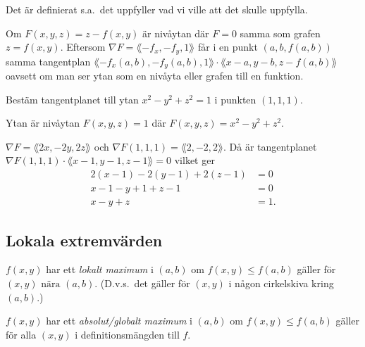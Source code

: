 \documentclass[a4paper]{article}
\begin{document}
Det är definierat s.a.\ det uppfyller vad vi ville att det skulle uppfylla.

\begin{obs}
    Om \(
        F(x,y,z) = z-f(x,y)
    \) är nivåytan där \(
        F = 0
    \) samma som grafen \(
        z = f(x,y)
    \). Eftersom \(
        \nabla F = \lang -f_x, -f_y, 1\rang
    \) får i en punkt \(
        (a, b, f(a,b)) 
    \) samma tangentplan \(
        \lang -f_x(a,b), -f_y(a,b), 1\rang \cdot \lang x-a, y-b, z-f(a,b)\rang
    \) oavsett om man ser ytan som en nivåyta eller grafen till en funktion.
\end{obs}

\begin{ex}
    Bestäm tangentplanet till ytan \(
        x^2-y^2+z^2 = 1
    \) i punkten \(
        (1, 1, 1)
    \). 

    Ytan är nivåytan \(
        F(x,y,z) = 1
    \) där \(
        F(x,y,z) = x^2-y^2+z^2
    \).

    \(
        \nabla F = \lang 2x, -2y, 2z\rang 
    \) och \(
        \nabla F(1,1,1) = \lang 2, -2, 2\rang
    \). Då är tangentplanet \(
        \nabla F(1,1,1) \cdot \lang x-1, y-1, z-1 \rang = 0
    \) vilket ger 
    \begin{align*}
        2(x-1)-2(y-1)+2(z-1)&=0\\
        x-1-y+1+z-1 &= 0 \\
        x-y+z &= 1.
    \end{align*}
\end{ex}

\subsection{Lokala extremvärden}
\begin{defn}
    \(
        f(x,y) 
    \) har ett \emph{lokalt maximum} i \(
        (a,b)
    \) om \(
        f(x,y) \leq f(a,b)
    \) gäller för \(
        (x,y) \text{ nära } (a,b)
    \). (D.v.s.\ det gäller för \(
        (x,y) 
    \) i någon cirkelskiva kring \(
        (a,b)
    \).)
\end{defn}

\begin{defn}
    \(
        f(x,y) 
    \) har ett \emph{absolut/globalt maximum} i \(
        (a,b)
    \) om \(
        f(x,y) \leq f(a,b)
    \) gäller för alla \(
        (x,y)
    \) i definitionsmängden till \(
        f
    \). 
\end{defn}
\end{document}
